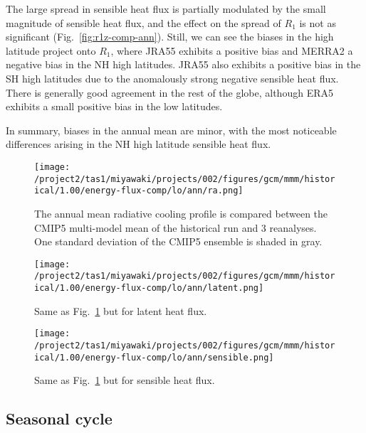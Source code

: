 \documentclass{article}
\begin{document}
The large spread in sensible heat flux is partially modulated by the small magnitude of sensible heat flux, and the effect on the spread of $R_1$ is not as significant (Fig.~\ref{fig:r1z-comp-ann}). Still, we can see the biases in the high latitude project onto $R_1$, where JRA55 exhibits a positive bias and MERRA2 a negative bias in the NH high latitudes. JRA55 also exhibits a positive bias in the SH high latitudes due to the anomalously strong negative sensible heat flux. There is generally good agreement in the rest of the globe, although ERA5 exhibits a small positive bias in the low latitudes.

In summary, biases in the annual mean are minor, with the most noticeable differences arising in the NH high latitude sensible heat flux.

\begin{figure}
    \texttt{[image: /project2/tas1/miyawaki/projects/002/figures/gcm/mmm/historical/1.00/energy-flux-comp/lo/ann/ra.png]}
    \caption{The annual mean radiative cooling profile is compared between the CMIP5 multi-model mean of the historical run and 3 reanalyses. One standard deviation of the CMIP5 ensemble is shaded in gray.}
    \label{fig:ra-comp-ann}
\end{figure}

\begin{figure}
    \texttt{[image: /project2/tas1/miyawaki/projects/002/figures/gcm/mmm/historical/1.00/energy-flux-comp/lo/ann/latent.png]}
    \caption{Same as Fig.~\ref{fig:ra-comp-ann} but for latent heat flux.}
    \label{fig:lh-comp-ann}
\end{figure}

\begin{figure}
    \texttt{[image: /project2/tas1/miyawaki/projects/002/figures/gcm/mmm/historical/1.00/energy-flux-comp/lo/ann/sensible.png]}
    \caption{Same as Fig.~\ref{fig:ra-comp-ann} but for sensible heat flux.}
    \label{fig:sh-comp-ann}
\end{figure}


\subsection{Seasonal cycle}
\end{document}
